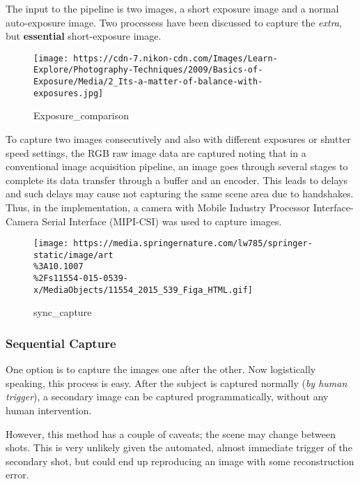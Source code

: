 The input to the pipeline is two images, a short exposure image and a
normal auto-exposure image. Two processess have been discussed to
capture the \emph{extra}, but \textbf{essential} short-exposure image.

\begin{figure}
  \begin{center}
  \texttt{[image: https://cdn-7.nikon-cdn.com/Images/Learn-Explore/Photography-Techniques/2009/Basics-of-Exposure/Media/2\_Its-a-matter-of-balance-with-exposures.jpg]}
  \caption{Exposure\_comparison}
  \end{center}
\end{figure}

To capture two images consecutively and also with different exposures or
shutter speed settings, the RGB raw image data are captured noting that
in a conventional image acquisition pipeline, an image goes through
several stages to complete its data transfer through a buffer and an
encoder. This leads to delays and such delays may cause not capturing
the same scene area due to handshakes. Thus, in the implementation, a
camera with Mobile Industry Processor Interface-Camera Serial Interface
(MIPI-CSI) was used to capture images.

\begin{figure}
  \begin{center}
  \texttt{[image: https://media.springernature.com/lw785/springer-static/image/art\\\%3A10.1007\\\%2Fs11554-015-0539-x/MediaObjects/11554\_2015\_539\_Figa\_HTML.gif]}
  \caption{sync\_capture}
  \end{center}
\end{figure}

\hypertarget{sequential-capture}{%
\subsubsection{Sequential Capture}\label{sequential-capture}}

One option is to capture the images one after the other. Now
logistically speaking, this process is easy. After the subject is
captured normally (\emph{by human trigger}), a secondary image can be
captured programmatically, without any human intervention.

However, this method has a couple of caveats; the scene may change
between shots. This is very unlikely given the automated, almost
immediate trigger of the secondary shot, but could end up reproducing an
image with some reconstruction error.

